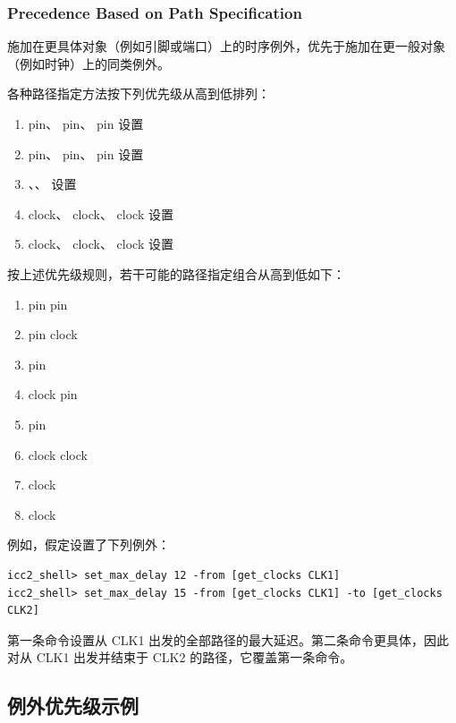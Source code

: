 \subsubsection*{Precedence Based on Path Specification}

施加在更具体对象（例如引脚或端口）上的时序例外，优先于施加在更一般对象（例如时钟）上的同类例外。

各种路径指定方法按下列优先级从高到低排列：
\begin{enumerate}
  \item {} pin、 pin、 pin 设置
  \item {} pin、 pin、 pin 设置
  \item {}、、 设置
  \item {} clock、 clock、 clock 设置
  \item {} clock、 clock、 clock 设置
\end{enumerate}

按上述优先级规则，若干可能的路径指定组合从高到低如下：
\begin{enumerate}
  \item {} pin  pin
  \item {} pin  clock
  \item {} pin
  \item {} clock  pin
  \item {} pin
  \item {} clock  clock
  \item {} clock
  \item {} clock
\end{enumerate}

例如，假定设置了下列例外：
\begin{lstlisting}
icc2_shell> set_max_delay 12 -from [get_clocks CLK1]
icc2_shell> set_max_delay 15 -from [get_clocks CLK1] -to [get_clocks CLK2]
\end{lstlisting}

第一条命令设置从 CLK1 出发的全部路径的最大延迟。第二条命令更具体，因此对从 CLK1 出发并结束于 CLK2 的路径，它覆盖第一条命令。

\subsection{例外优先级示例}
